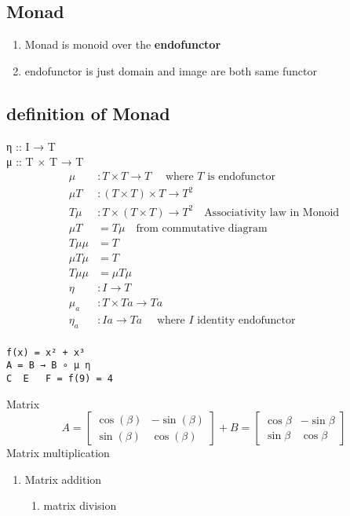\documentclass[11pt]{article}
\author{cat}
\date{\today}
\title{}
\begin{document}
\tableofcontents

\subsection{Monad}
\label{sec:org037e185}
\begin{enumerate}
\item Monad is monoid over the \textbf{endofunctor}
\item endofunctor is just domain and image are both same functor
\end{enumerate}
\subsection{definition of Monad}
\label{sec:orga7dd9ca}
η :: I → T  \\
μ :: T × T → T
\begin{align*}
 \mu &: T \times T \rightarrow T  \quad \text{ where } T \text{ is endofunctor}     \\ 
 \mu T &: (T \times T) \times T \rightarrow T^2  \\
 T \mu &: T \times (T \times T) \rightarrow T^2  \quad \text{Associativity law in Monoid}\\
 \mu T &= T \mu  \quad \text{from commutative diagram} \\
 T \mu \mu   &= T \\
 \mu T \mu &= T \\
 T \mu \mu &= \mu T \mu \\
 \eta &: I  \rightarrow T              \\ 
 \mu_a &: T \times T a \rightarrow T a \\ 
 \eta_a &: I a \rightarrow T a     \quad \text{ where } I \text{ identity endofunctor }    \\ 
\end{align*}
\begin{verbatim}
f(x) = x² + x³
A = B → B ∘ μ η
C  E   F = f(9) = 4
\end{verbatim}
Matrix
\[
    A= \begin{bmatrix}
    \cos(\beta) & -\sin(\beta)\\
    \sin(\beta) & \cos(\beta)
    \end{bmatrix} + 
    B = \begin{bmatrix}
       \cos \beta & -\sin \beta \\
       \sin \beta &  \cos \beta
       \end{bmatrix}
    \]
 Matrix multiplication
\begin{enumerate}
\item Matrix addition
\begin{enumerate}
\item matrix division
\end{enumerate}
\end{enumerate}
\end{document}
